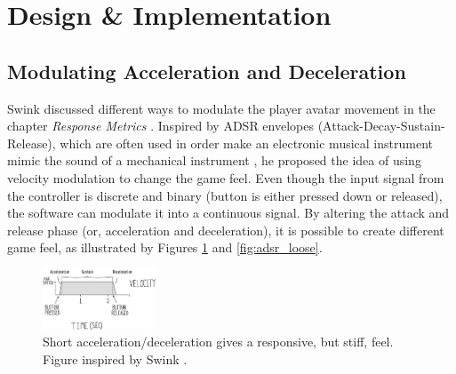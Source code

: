\section{Design \& Implementation} \label{design}
\subsection{Modulating Acceleration and Deceleration}
Swink discussed different ways to modulate the player avatar movement in the chapter \textit{Response Metrics} \cite{swink}. Inspired by ADSR envelopes (Attack-Decay-Sustain-Release), which are often used in order make an electronic musical instrument mimic the sound of a mechanical instrument \cite{adsr}, he proposed the idea of using velocity modulation to change the game feel. Even though the input signal from the controller is discrete and binary (button is either pressed down or released), the software can modulate it into a continuous signal. By altering the attack and release phase (or, acceleration and deceleration), it is possible to create different game feel, as illustrated by Figures \ref{fig:adsr_stiff} and \ref{fig:adsr_loose}.





\begin{figure}[htbp]
\centering
\includegraphics[width=0.30\textwidth]{Pics/adsr_stiff}
\caption{Short acceleration/deceleration gives a responsive, but stiff, feel. Figure inspired by Swink \cite{swink}.}
\label{fig:adsr_stiff}
\end{figure}

